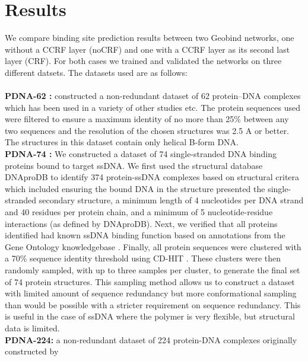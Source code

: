 \section{Results} We compare binding site prediction results between two Geobind networks, one
without a CCRF layer (noCRF) and one with a CCRF layer as its second last layer (CRF). For both
cases we trained and validated the networks on three different datsets. The datasets used are as
follows:\\ \\ \textbf{PDNA-62 :} \citet{ahmad2004analysis} constructed a non-redundant dataset of 62
protein–DNA complexes which has been used in a variety of other studies
\citep{kuznetsov2006transient, wang2006bindn} etc. The protein sequences used were filtered to
ensure a maximum identity of no more than 25\% between any two sequences and the resolution of the
chosen structures was 2.5 A or better. The structures in this dataset contain only helical B-form
DNA.\\ \textbf{PDNA-74 :} We constructed a dataset of 74 single-stranded DNA binding proteins bound
to target ssDNA. We first used the structural database DNAproDB
\citep{sagendorf2017dnaprodb,sagendorf2020dnaprodb} to identify 374 protein-ssDNA complexes based on
structural critera which included ensuring the bound DNA in the structure presented the
single-stranded secondary structure, a minimum length of 4 nucleotides per DNA strand and 40
residues per protein chain, and a minimum of 5 nucleotide-residue interactions (as defined by
DNAproDB). Next, we verified that all proteins identified had known ssDNA binding function based on
annotations from the Gene Ontology knowledgebase \citep{gene2019gene}.  Finally, all protein
sequences were clustered with a 70\% sequence identity threshold using CD-HIT \citep{li2006cd}.
These clusters were then randomly sampled, with up to three samples per cluster, to generate the
final set of 74 protein structures. This sampling method allows us to construct a dataset with
limited amount of sequence redundancy but more conformational sampling than would be possible with a
stricter requirement on sequence redundancy. This is useful in the case of ssDNA where the polymer
is very flexible, but structural data is limited.\\ \textbf{PDNA-224:} a non-redundant dataset of
224 protein-DNA complexes originally constructed by \citet{li2013predna}\\ 
